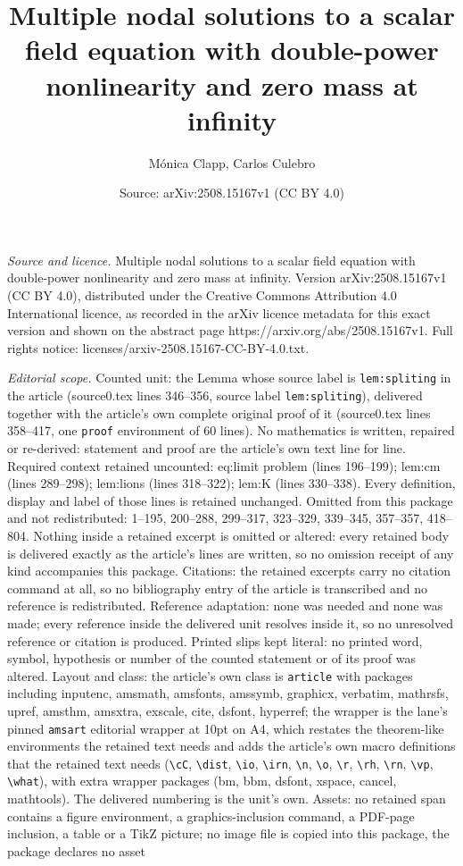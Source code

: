 \documentclass[10pt,a4paper]{amsart}
\title[Multiple nodal solutions to a scalar field equation with dou]{Multiple nodal solutions to a scalar field equation with double-power nonlinearity and zero mass at infinity}
\author{M\'onica Clapp, Carlos Culebro}
\date{Source: arXiv:2508.15167v1 (CC BY 4.0)}
\begin{document}
\maketitle

\noindent\emph{Source and licence.} Multiple nodal solutions to a scalar field equation with double-power nonlinearity and zero mass at infinity. Version arXiv:2508.15167v1 (CC BY 4.0), distributed under the Creative Commons Attribution 4.0 International licence, as recorded in the arXiv licence metadata for this exact version and shown on the abstract page https://arxiv.org/abs/2508.15167v1. Full rights notice: licenses/arxiv-2508.15167-CC-BY-4.0.txt.\par\smallskip

\noindent\textit{Editorial scope.} Counted unit: the Lemma whose source label is \texttt{lem:spliting} in the article (source0.tex lines 346--356, source label \texttt{lem:spliting}), delivered together with the article's own complete original proof of it (source0.tex lines 358--417, one \texttt{proof} environment of 60 lines). No mathematics is written, repaired or re-derived: statement and proof are the article's own text line for line. Required context retained uncounted: eq:limit problem (lines 196--199); lem:cm (lines 289--298); lem:lions (lines 318--322); lem:K (lines 330--338). Every definition, display and label of those lines is retained unchanged. Omitted from this package and not redistributed: 1--195, 200--288, 299--317, 323--329, 339--345, 357--357, 418--804. Nothing inside a retained excerpt is omitted or altered: every retained body is delivered exactly as the article's lines are written, so no omission receipt of any kind accompanies this package. Citations: the retained excerpts carry no citation command at all, so no bibliography entry of the article is transcribed and no reference is redistributed. Reference adaptation: none was needed and none was made; every reference inside the delivered unit resolves inside it, so no unresolved reference or citation is produced. Printed slips kept literal: no printed word, symbol, hypothesis or number of the counted statement or of its proof was altered. Layout and class: the article's own class is \texttt{article} with packages including inputenc, amsmath, amsfonts, amssymb, graphicx, verbatim, mathrsfs, upref, amsthm, amsxtra, exscale, cite, dsfont, hyperref; the wrapper is the lane's pinned \texttt{amsart} editorial wrapper at 10pt on A4, which restates the theorem-like environments the retained text needs and adds the article's own macro definitions that the retained text needs (\texttt{\textbackslash cC}, \texttt{\textbackslash dist}, \texttt{\textbackslash io}, \texttt{\textbackslash irn}, \texttt{\textbackslash n}, \texttt{\textbackslash o}, \texttt{\textbackslash r}, \texttt{\textbackslash rh}, \texttt{\textbackslash rn}, \texttt{\textbackslash vp}, \texttt{\textbackslash what}), with extra wrapper packages (bm, bbm, dsfont, xspace, cancel, mathtools). The delivered numbering is the unit's own. Assets: no retained span contains a figure environment, a graphics-inclusion command, a PDF-page inclusion, a table or a TikZ picture; no image file is copied into this package, the package declares no asset 
\end{document}

